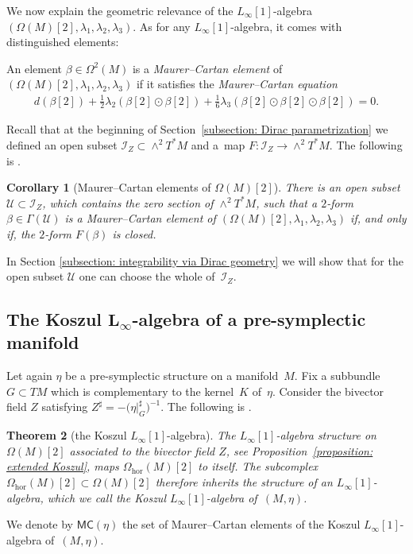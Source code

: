\documentclass[pdftex]{sigma}
\numberwithin{equation}{section}
\newtheorem{Theorem}{Theorem}[section]
\newtheorem{Corollary}[Theorem]{Corollary}
\newcommand{\hor}{\mathrm{hor}}
\newcommand{\MC}{\mathsf{MC}}
\newcommand{\lione}{$L_{\infty}[1]$-algebra }
\begin{document}
We now explain the geometric relevance of the $L_{\infty}[1]$-algebra $(\Omega(M)[2],\lambda_1,\lambda_2,\lambda_3)$. As for any $L_\infty[1]$-algebra, it comes with distinguished elements:

\begin{Definition}\label{definition: Maurer--Cartan equation} An element $\beta \in \Omega^2(M)$ is a {\em Maurer--Cartan element} of $(\Omega(M)[2],\lambda_1,\lambda_2,\lambda_3)$ if it satisfies the {\em Maurer--Cartan equation}
\begin{gather*} d(\beta[2]) + \tfrac{1}{2}\lambda_2(\beta[2]\odot \beta[2]) + \tfrac{1}{6}\lambda_3(\beta[2]\odot \beta[2]\odot \beta[2])=0.\end{gather*}
\end{Definition}

Recall that at the beginning of Section~\ref{subsection: Dirac parametrization} we defined an open subset $\mathcal{I}_Z \subset {\wedge^2 T^*M}$ and a~map $F \colon \mathcal{I}_Z\to \wedge^2 T^*M$. The following is \cite[Corollary~3.9]{SZPre}.
\begin{Corollary}[Maurer--Cartan elements of {$\Omega(M)[2]$}]\label{corollary: MC for bivector fields} There is an open subset $\mathcal{U}\subset \mathcal{I}_Z$, which contains the zero section of $\wedge^2 T^*M$, such that a $2$-form $\beta \in \Gamma(\mathcal{U})$ is a Maurer--Cartan element of $(\Omega(M)[2],\lambda_1,\lambda_2,\lambda_3)$ if, and only if, the $2$-form $F(\beta)$ is closed.
\end{Corollary}

In Section \ref{subsection: integrability via Dirac geometry} we will show that for the open subset $\mathcal{U}$ one can choose the whole of~$\mathcal{I}_Z$.

\subsection[The Koszul $L_\infty$-algebra of a pre-symplectic manifold]{The Koszul $\boldsymbol{L_\infty}$-algebra of a pre-symplectic manifold}\label{subsection: Koszul for pre-symplectic}

Let again $\eta$ be a pre-symplectic structure on a manifold~$M$. Fix a subbundle $G\subset TM$ which is complementary to the kernel~$K$ of~$\eta$. Consider the bivector field $Z$ satisfying $Z^\sharp = -\big(\eta\vert_G^\sharp\big)^{-1}$. The following is \cite[Theorem~3.17]{SZPre}.

\begin{Theorem}[the Koszul {$L_\infty[1]$}-algebra]\label{theorem: construction - Koszul L-infty} The $L_{\infty}[1]$-algebra structure on $\Omega(M)[2]$ associated to the bivector field $Z$, see Proposition~{\rm \ref{proposition: extended Koszul}}, maps $\Omega_\hor(M)[2]$ to itself. The subcomplex $\Omega_\hor(M)[2] \subset \Omega(M)[2]$ therefore inherits the structure of an $L_\infty[1]$-algebra, which we call the Koszul $L_\infty[1]$-algebra of~$(M,\eta)$.
\end{Theorem}
 We denote by $\MC(\eta)$ the set of Maurer--Cartan elements of the Koszul \lione of~$(M,\eta)$.
\end{document}
